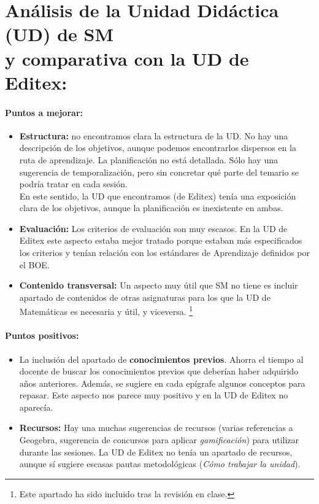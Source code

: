\section{Análisis de la Unidad Didáctica (UD) de SM\\\quad\quad\small{y comparativa con la UD de Editex}:}

\label{sec1}

\paragraph{Puntos a mejorar:}


\begin{itemize}
\item \textbf{Estructura:} no encontramos clara la estructura de la UD.
	\subitem No hay una descripción de los objetivos, aunque podemos encontrarlos dispersos en la ruta de aprendizaje.
	\subitem La planificación no está detallada. Sólo hay una sugerencia de temporalización, pero sin concretar qué parte del temario se podría tratar en cada sesión. \\
En este sentido, la UD que encontramos (de Editex) tenía una exposición clara de los objetivos, aunque la planificación es inexistente en ambas.

\item \textbf{Evaluación:} Los criterios de evaluación son muy escasos. En la UD de Editex este aspecto estaba mejor tratado porque estaban más especificados los criterios y tenían relación con los estándares de Aprendizaje definidos por el BOE.

\item \textbf{Contenido transversal:} Un aspecto muy útil que SM no tiene es incluir apartado de contenidos de otras asignaturas para los que la UD de Matemáticas es necesaria y útil, y viceversa.
\footnote{Este apartado ha sido incluido tras la revisión en clase.}

\end{itemize}


\paragraph{Puntos positivos:}

\begin{itemize}
\item La inclusión del apartado de \textbf{conocimientos previos}. Ahorra el tiempo al docente de buscar los conocimientos previos que deberían haber adquirido años anteriores.
Además, se sugiere en cada epígrafe algunos conceptos para repasar.
Este aspecto nos parece muy positivo y en la UD de Editex no aparecía. 

\item \textbf{Recursos:} Hay una muchas sugerencias de recursos (varias referencias a Geogebra, sugerencia de concursos para aplicar \textit{gamificación}) para utilizar durante las sesiones.
La UD de Editex no tenía un apartado de recursos, aunque sí sugiere escasas pautas metodológicas (\textit{Cómo trabajar la unidad}).
\end{itemize}


